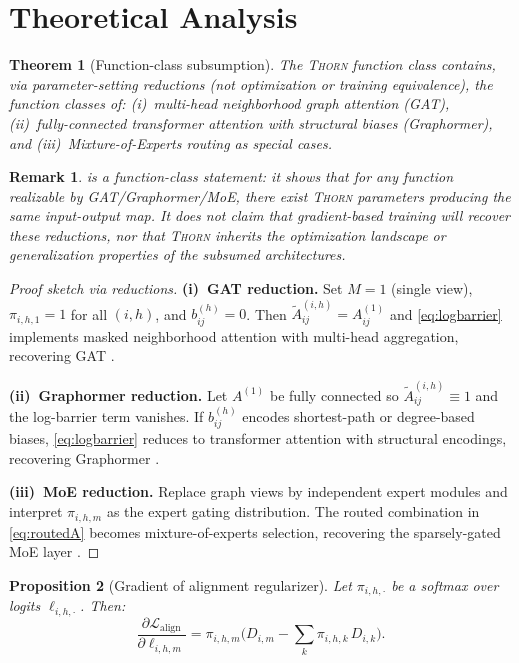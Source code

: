 \documentclass[11pt,a4paper]{article}
\newtheorem{theorem}{Theorem}
\newtheorem{proposition}[theorem]{Proposition}
\newtheorem{remark}{Remark}
\newcommand{\thorn}{\textsc{Thorn}}
\newcommand{\calL}{\mathcal{L}}
\begin{document}
\section{Theoretical Analysis}
\label{sec:theory}

\begin{theorem}[Function-class subsumption]
  \label{thm:subsumption}
  The \thorn{} function class contains, via parameter-setting reductions
  (not optimization or training equivalence), the function classes of:
  (i)~multi-head neighborhood graph attention (GAT),
  (ii)~fully-connected transformer attention with structural biases
  (Graphormer), and
  (iii)~Mixture-of-Experts routing
  as special cases.
\end{theorem}

\begin{remark}
   is a \emph{function-class} statement: it shows
  that for any function realizable by GAT/Graphormer/MoE, there exist
  \thorn{} parameters producing the same input-output map.
  It does \emph{not} claim that gradient-based training will recover
  these reductions, nor that \thorn{} inherits the optimization
  landscape or generalization properties of the subsumed architectures.
\end{remark}

\begin{proof}[Proof sketch via reductions]
  \textbf{(i)~GAT reduction.}
  Set $M = 1$ (single view), $\pi_{i,h,1} = 1$ for all $(i, h)$, and
  $b_{ij}^{(h)} = 0$.
  Then $\tilde{A}_{ij}^{(i,h)} = A_{ij}^{(1)}$ and
  \eqref{eq:logbarrier} implements masked neighborhood attention with
  multi-head aggregation, recovering GAT \citep{velickovic2018graph}.

  \textbf{(ii)~Graphormer reduction.}
  Let $A^{(1)}$ be fully connected so
  $\tilde{A}_{ij}^{(i,h)} \equiv 1$ and the log-barrier term vanishes.
  If $b_{ij}^{(h)}$ encodes shortest-path or degree-based biases,
  \eqref{eq:logbarrier} reduces to transformer attention with structural
  encodings, recovering Graphormer \citep{ying2021transformers}.

  \textbf{(iii)~MoE reduction.}
  Replace graph views by independent expert modules and interpret
  $\pi_{i,h,m}$ as the expert gating distribution.
  The routed combination in \eqref{eq:routedA} becomes mixture-of-experts
  selection, recovering the sparsely-gated MoE layer
  \citep{shazeer2017outrageously}.
\end{proof}

\begin{proposition}[Gradient of alignment regularizer]
  \label{prop:reinforce}
  Let $\pi_{i,h,\cdot}$ be a softmax over logits $\ell_{i,h,\cdot}$.
  Then:
  \begin{equation}
    \frac{\partial \calL_{\mathrm{align}}}{\partial \ell_{i,h,m}}
    = \pi_{i,h,m} \Big(
      D_{i,m} - \sum_{k} \pi_{i,h,k}\, D_{i,k}
    \Big).
  \end{equation}
\end{proposition}
\end{document}
